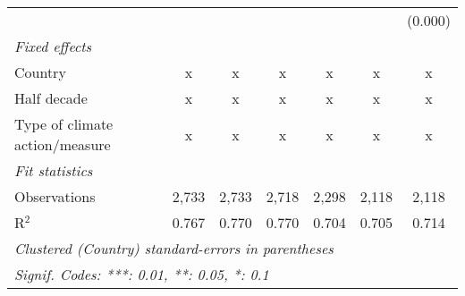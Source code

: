 \begin{tabular}{lcccccc}
                                                             &         &             &              &                &                & (0.000)\\   
   \emph{Fixed effects}\\
   Country                                                   & x       & x           & x            & x              & x              & x\\  
   Half decade                                               & x       & x           & x            & x              & x              & x\\  
   Type of climate action/measure                            & x       & x           & x            & x              & x              & x\\  
   \midrule \emph{Fit statistics}\\
   Observations                                              & 2,733   & 2,733       & 2,718        & 2,298          & 2,118          & 2,118\\  
   R$^2$                                                     & 0.767   & 0.770       & 0.770        & 0.704          & 0.705          & 0.714\\  
   \midrule
   \multicolumn{7}{l}{\emph{Clustered (Country) standard-errors in parentheses}}\\
   \multicolumn{7}{l}{\emph{Signif. Codes: ***: 0.01, **: 0.05, *: 0.1}}\\
\end{tabular}
\par\endgroup


